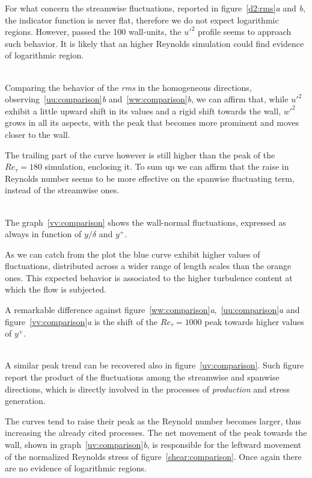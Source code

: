 For what concern the streamwise fluctuations, reported in figure~\ref{d2:rms}\emph{a} and \emph{b}, the indicator function is never flat, therefore we do not expect logarithmic regions. However, passed the 100 wall-units, the $u'^{2}$ profile seems to approach such behavior. It is likely that an higher Reynolds simulation could find evidence of logarithmic region.\\~\par

Comparing the behavior of the \emph{rms} in the homogeneous directions, observing~\ref{uu:comparison}\emph{b} and~\ref{ww:comparison}\emph{b}, we can affirm that, while $u'^{2}$ exhibit a little upward shift in its values and a rigid shift towards the wall, $w'^{2}$ grows in all its aspects, with the peak that becomes more prominent and moves closer to the wall. \par
The trailing part of the curve however is still higher than the peak of the $Re_{\tau}=180$ simulation, enclosing it. To sum up we can affirm that the raise in Reynolds number seems to be more effective on the spanwise fluctuating term, instead of the streamwise ones.\\~\par


The graph~\ref{vv:comparison} shows the wall-normal fluctuations, expressed as always in function of $y/\delta$ and $y^{+}$.\par
As we can catch from the plot the blue curve exhibit higher values of fluctuations, distributed across a wider range of length scales than the orange ones. This expected behavior is associated to the higher turbulence content at which the flow is subjected. \par
A remarkable difference against figure~\ref{ww:comparison}\emph{a},~\ref{uu:comparison}\emph{a} and figure~\ref{vv:comparison}\emph{a} is the shift of the $Re_{\tau}=1000$ peak towards higher values of $y^{+}$. \\~\par

A similar peak trend can be recovered also in figure~\ref{uv:comparison}. Such figure report the product of the fluctuations among the streamwise and spanwise directions, which is directly involved in the processes of \emph{production} and stress generation.\par
The curves tend to raise their peak as the Reynold number becomes larger, thus increasing the already cited processes. The net movement of the peak towards the wall, shown in graph~\ref{uv:comparison}\emph{b}, is responsible for the leftward movement of the normalized Reynolds stress of figure~\ref{shear:comparison}.
Once again there are no evidence of logarithmic regions. \\~\par

